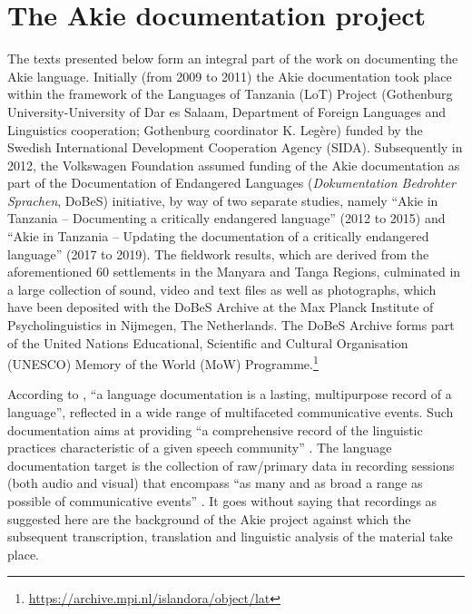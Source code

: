 \documentclass[output=paper,colorlinks,citecolor=brown]{langscibook}
\begin{document}
\section{The Akie documentation project}\label{sec:legere:2}

The texts presented below form an integral part of the work on documenting the Akie language. Initially (from 2009 to 2011) the Akie documentation took place within the framework of the Languages of Tanzania (LoT) Project (Gothenburg University-University of Dar es Salaam, Department of Foreign Languages and Linguistics cooperation; Gothenburg coordinator K. Legère) funded by the Swedish International Development Cooperation Agency (SIDA). Subsequently in 2012, the Volkswagen Foundation assumed funding of the Akie documentation as part of the Documentation of Endangered Languages (\textit{Dokumentation Bedrohter Sprachen}, DoBeS) initiative, by way of two separate studies, namely “Akie in Tanzania – Documenting a critically endangered language” (2012 to 2015) and “Akie in Tanzania – Updating the documentation of a critically endangered language” (2017 to 2019). The fieldwork results, which are derived from the aforementioned 60 settlements in the Manyara and Tanga Regions, culminated in a large collection of sound, video and text files as well as photographs, which have been deposited with the DoBeS Archive at the Max Planck Institute of Psycholinguistics in Nijmegen, The Netherlands. The DoBeS Archive forms part of the United Nations Educational, Scientific and Cultural Organisation (UNESCO) Memory of the World (MoW) Programme.\footnote{\url{https://archive.mpi.nl/islandora/object/lat}}

According to \citet[1]{HimmelmannEtAl2006}, “a language documentation is a lasting, multipurpose record of a language”, reflected in a wide range of multifaceted communicative events. Such documentation aims at providing “a comprehensive record of the linguistic practices characteristic of a given speech community” \citep[166]{Himmelmann1998}. The language documentation target is the collection of raw/primary data in recording sessions (both audio and visual) that encompass “as many and as broad a range as possible of communicative events” \citep[7]{HimmelmannEtAl2006} . It goes without saying that recordings as suggested here are the background of the Akie project against which the subsequent transcription, translation and linguistic analysis of the material take place.
\end{document}
